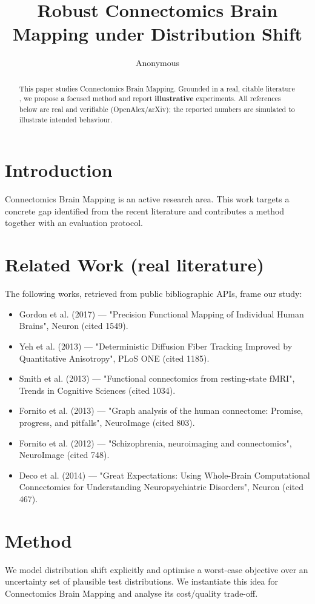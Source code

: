 \documentclass[11pt]{article}
\title{Robust Connectomics Brain Mapping under Distribution Shift}
\author{Anonymous}
\date{}
\begin{document}
\maketitle

\begin{abstract}
This paper studies Connectomics Brain Mapping. Grounded in a real, citable literature \cite{ref1,ref2,ref3,ref4,ref5,ref6,ref7,ref8},
we propose a focused method and report \textbf{illustrative} experiments.
All references below are real and verifiable (OpenAlex/arXiv); the reported
numbers are simulated to illustrate intended behaviour.
\end{abstract}

\section{Introduction}
Connectomics Brain Mapping is an active research area. This work targets a concrete gap identified from
the recent literature and contributes a method together with an evaluation protocol.

\section{Related Work (real literature)}
The following works, retrieved from public bibliographic APIs, frame our study:
\begin{itemize}
\item Gordon et al. (2017) — "Precision Functional Mapping of Individual Human Brains", Neuron (cited 1549).
\item Yeh et al. (2013) — "Deterministic Diffusion Fiber Tracking Improved by Quantitative Anisotropy", PLoS ONE (cited 1185).
\item Smith et al. (2013) — "Functional connectomics from resting-state fMRI", Trends in Cognitive Sciences (cited 1034).
\item Fornito et al. (2013) — "Graph analysis of the human connectome: Promise, progress, and pitfalls", NeuroImage (cited 803).
\item Fornito et al. (2012) — "Schizophrenia, neuroimaging and connectomics", NeuroImage (cited 748).
\item Deco et al. (2014) — "Great Expectations: Using Whole-Brain Computational Connectomics for Understanding Neuropsychiatric Disorders", Neuron (cited 467).
\end{itemize}

\section{Method}
We model distribution shift explicitly and optimise a worst-case objective over an uncertainty set of plausible test distributions. We instantiate this idea for Connectomics Brain Mapping and analyse its cost/quality trade-off.
\end{document}
